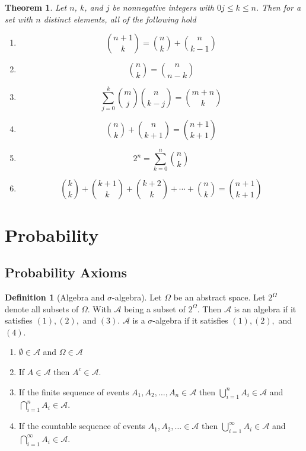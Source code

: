 \documentclass{article}
\newtheorem{theorem}{Theorem}[section]
\theoremstyle{definition}
\newtheorem{definition}{Definition}[section]
\theoremstyle{remark}
\begin{document}
\begin{theorem}
Let $n$, $k$, and $j$ be nonnegative integers with $0j\leq k \leq n$. 
Then for a set with $n$ distinct elements, all of the following hold
\begin{enumerate}
\item \[\binom{n+1}{k} = \binom{n}{k} + \binom{n}{k-1}\]
\item \[\binom{n}{k} = \binom{n}{n-k}\]
\item \[\sum^k_{j=0}{\binom{m}{j}\binom{n}{k-j}} = \binom{m+n}{k}\]
\item \[\binom{n}{k} + \binom{n}{k+1} = \binom{n+1}{k+1}\]
\item \[2^n = \sum^n_{k=0}{\binom{n}{k}}\]
\item \[\binom{k}{k}+ \binom{k+1}{k} + \binom{k+2}{k} + \cdots +\binom{n}{k} = \binom{n+1}{k+1}   \]
\end{enumerate}
\end{theorem}




\section{Probability}
\subsection{Probability Axioms}
\begin{definition}[Algebra and $\sigma$-algebra]\label{def:sigma algebra}
Let $\Omega$ be an abstract space. Let $2^{\Omega}$ denote all subsets of $\Omega$. With $\mathcal{A}$ being a subset of $2^\Omega$. Then $\mathcal{A}$ is an algebra if it satisfies $(1),(2),$ and $(3)$. $\mathcal{A}$ is a $\sigma$-algebra if it satisfies $(1), (2),$ and $(4)$.
\begin{enumerate}
\item $\emptyset \in \mathcal{A}$ and $\Omega \in \mathcal{A}$
\item If $ A \in \mathcal{A}$ then $A^c \in \mathcal{A}$.
\item If the finite sequence of events $A_1, A_2, \dots ,A_n \in \mathcal{A}$ then $\bigcup^n_{i=1}{A_i} \in \mathcal{A}$ and $\bigcap^n_{i=1}{A_i} \in \mathcal{A}$.
\item If the countable sequence of events $A_1, A_2, \dots \in \mathcal{A}$ then $\bigcup^\infty_{i=1}{A_i} \in \mathcal{A}$ and $ \bigcap^\infty_{i=1}{A_i} \in \mathcal{A}    $. 
\end{enumerate}

\end{definition}
\end{document}
